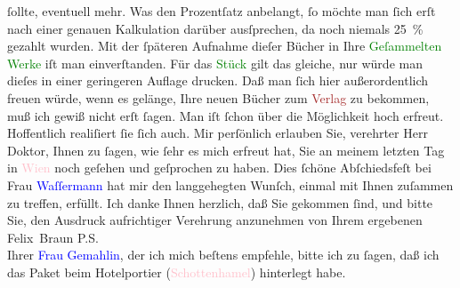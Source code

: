                     ſollte, eventuell mehr. Was den Prozentſatz anbelangt, ſo möchte man ſich erſt
                    nach einer genauen Kalkulation darüber ausſprechen, da noch niemals 25 {\%} gezahlt wurden. Mit der ſpäteren Aufnahme dieſer
                    Bücher in Ihre \textcolor{green}{Geſammelten Werke}{}\ledrightnote{\textcolor{green}{Gesammelte Werke}} iſt man
                    einverſtanden. Für das \textcolor{green}{Stück}{}
                    gilt das gleiche, nur würde man dieſes in einer geringeren Auflage drucken.\pend
           \pstart
           Daß man ſich hier außerordentlich freuen würde, wenn es gelänge, Ihre neuen
                    Bücher zum \textcolor{brown}{Verlag}{} zu
                    bekommen, muß ich gewiß nicht erſt ſagen. Man iſt ſchon über die Möglichkeit
                    hoch erfreut. Hoffentlich realiſiert ſie ſich auch.\pend
           \pstart
           {\pb}Mir perſönlich erlauben Sie, verehrter Herr
                    Doktor, Ihnen zu ſagen, wie ſehr es mich erfreut hat, Sie an meinem letzten Tag
                    in \textcolor{pink}{Wien}{}\ledrightnote{\textcolor{pink}{Wien}} noch geſehen und geſprochen zu haben.
                    Dies ſchöne Abſchiedsfeſt bei Frau \textcolor{blue}{Waſſermann}{}\ledrightnote{\textcolor{blue}{Julie Wassermann}} hat mir den langgehegten Wunſch, einmal mit Ihnen zuſammen
                    zu treffen, erfüllt. Ich danke Ihnen herzlich, daß Sie gekommen ſind, und bitte
                    Sie, den Ausdruck aufrichtiger Verehrung anzunehmen von Ihrem ergebenen\pend
           \pstart \spacefill\mbox{Felix Braun}\pend{}\pstart
           \noindent{}P.S.{\\}Ihrer \textcolor{blue}{Frau
                            Gemahlin}{}, der ich mich beſtens empfehle, bitte ich zu ſagen, daß
                        ich das Paket beim Hotelportier (\textcolor{pink}{Schottenhamel}{}\ledrightnote{\textcolor{pink}{Hotel Schottenhamel}}) hinterlegt habe.\pend
           \endnumbering{}  
      